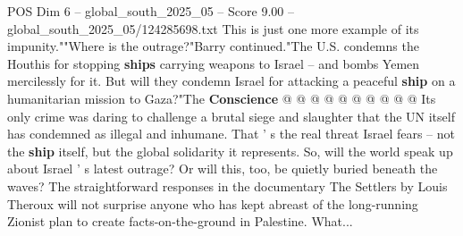 \begin{textsample}{POS Dim 6 – global\_south\_2025\_05 – Score 9.00 – global\_south\_2025\_05/124285698.txt}
This is just one more example of its impunity.""Where is the outrage?"Barry continued."The U.S. condemns the Houthis for stopping \textbf{ships} carrying weapons to Israel -- and bombs Yemen mercilessly for it.
But will they condemn Israel for attacking a peaceful \textbf{ship} on a humanitarian mission to Gaza?"The \textbf{Conscience} @ @ @ @ @ @ @ @ @ @ Its only crime was daring to challenge a brutal siege and slaughter that the UN itself has condemned as illegal and inhumane.
That ' s the real threat Israel fears -- not the \textbf{ship} itself, but the global solidarity it represents.
So, will the world speak up about Israel ' s latest outrage?
Or will this, too, be quietly buried beneath the waves?
The straightforward responses in the documentary The Settlers by Louis Theroux will not surprise anyone who has kept abreast of the long-running Zionist plan to create facts-on-the-ground in Palestine.
What...

\end{textsample}
